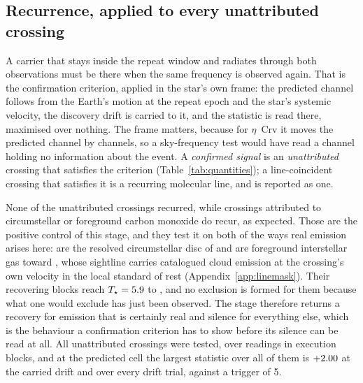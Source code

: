 \subsection{Recurrence, applied to every unattributed crossing}
\label{sec:etacrv}

A carrier that stays inside the repeat window and radiates through both
observations must be there when the same frequency is observed again. That is
the confirmation criterion, applied in the star's own frame: the predicted
channel follows from the Earth's motion at the repeat epoch and the star's
systemic velocity, the discovery drift is carried to it, and the statistic is
read there, maximised over nothing. The frame matters, because for
$\eta$~Crv it moves the predicted channel by \VnEcrDchan{} channels, so a
sky-frequency test would have read a channel holding no information about the
event. A \emph{confirmed signal} is an \emph{unattributed} crossing that
satisfies the criterion (Table~\ref{tab:quantities}); a line-coincident
crossing that satisfies it is a recurring molecular line, and is reported as
one.

None of the unattributed crossings recurred, while \MkAttrRecur{} crossings
attributed to circumstellar or foreground carbon monoxide do recur, as
expected. Those \MkAttrRecur{} are the positive control of this stage, and
they test it on both of the ways real emission arises here: \RqNRecurDisc{}
are the resolved circumstellar disc of \RqRecurDiscStars{} and
\RqNRecurCloud{} are foreground interstellar gas toward \RqRecurCloudStars,
whose sightline carries catalogued cloud emission at the crossing's own
velocity in the local standard of rest (Appendix~\ref{app:linemask}). Their
recovering blocks reach $T_\star=5.9$ to \MkAttrRecurTHi, and no
exclusion is formed for them because what one would exclude has just been
observed. The stage therefore returns a recovery for
emission that is certainly real and silence for everything else, which is the
behaviour a confirmation criterion has to show before its silence can be read
at all. All \RcNTested{} unattributed crossings were tested, over
\RcNRepeatMeas{} readings in \RcNRepeatBlock{} execution blocks, and at the
predicted cell the largest statistic over all of them is $+2.00$ at the
carried drift and \RcTMax{} over every drift trial, against a trigger of 5.

